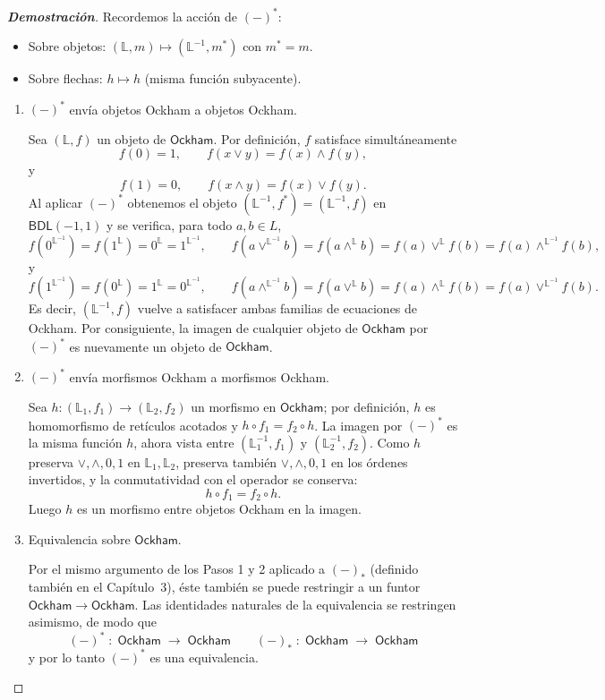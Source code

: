\documentclass[12pt]{book}
\newcommand{\BDL}{\mathsf{BDL}}
\newcommand{\Ock}{\mathsf{Ockham}}
\begin{document}
\begin{proof}[\textbf{Demostración}]
Recordemos la acción de $(-)^*$:
\begin{itemize}
  \item Sobre objetos: $(\mathbb{L},m)\mapsto (\mathbb{L}^{-1},m^*)$ con $m^*=m$.
  \item Sobre flechas: $h\mapsto h$ (misma función subyacente).
\end{itemize}
\begin{enumerate}

\item  $(-)^*$ envía objetos Ockham a objetos Ockham.

Sea $(\mathbb{L},f)$ un objeto de $\Ock$.
Por definición, $f$ satisface simultáneamente
\[
    f(0)=1,\qquad f(x\vee y)=f(x)\wedge f(y),
  \]
  y
  \[
    f(1)=0,\qquad f(x\wedge y)=f(x)\vee f(y).
  \]
Al aplicar $(-)^*$ obtenemos el objeto $(\mathbb{L}^{-1},f^*)=(\mathbb{L}^{-1},f)$ en $\BDL(-1,1)$ y se verifica, para todo $a,b\in L$,
\[
f(0^{\mathbb{L}^{-1}})=f(1^{\mathbb{L}})=0^{\mathbb{L}}=1^{\mathbb{L}^{-1}},
\qquad
f(a\vee^{\mathbb{L}^{-1}} b)=f(a\wedge^{\mathbb{L}} b)
= f(a)\vee^{\mathbb{L}} f(b)=f(a)\wedge^{\mathbb{L}^{-1}} f(b),
\]
y
\[
f(1^{\mathbb{L}^{-1}})=f(0^{\mathbb{L}})=1^{\mathbb{L}}=0^{\mathbb{L}^{-1}},
\qquad
f(a\wedge^{\mathbb{L}^{-1}} b)=f(a\vee^{\mathbb{L}} b)
= f(a)\wedge^{\mathbb{L}} f(b)=f(a)\vee^{\mathbb{L}^{-1}} f(b).
\]
Es decir, $(\mathbb{L}^{-1},f)$ vuelve a satisfacer ambas familias de ecuaciones de Ockham.
Por consiguiente, la imagen de cualquier objeto de $\Ock$ por $(-)^*$ es nuevamente un objeto de $\Ock$.

\smallskip
\item $(-)^*$ envía morfismos Ockham a morfismos Ockham.

Sea $h:(\mathbb{L}_1,f_1)\to(\mathbb{L}_2,f_2)$ un morfismo en $\Ock$; por definición,
$h$ es homomorfismo de retículos acotados y $h\circ f_1=f_2\circ h$.
La imagen por $(-)^*$ es la misma función $h$, ahora vista entre $(\mathbb{L}_1^{-1},f_1)$ y $(\mathbb{L}_2^{-1},f_2)$.
Como $h$ preserva $\vee,\wedge,0,1$ en $\mathbb{L}_1,\mathbb{L}_2$, preserva también $\vee,\wedge,0,1$ en los órdenes invertidos, y la conmutatividad con el operador se conserva:
\[
h\circ f_1=f_2\circ h.
\]
Luego $h$ es un morfismo entre objetos Ockham en la imagen.

\smallskip
\item Equivalencia sobre $\Ock$.

Por el mismo argumento de los Pasos 1 y 2 aplicado a $(-)_*$ (definido también en el Capítulo~3), éste también se puede restringir a un funtor $\Ock\to\Ock$.
Las identidades naturales de la equivalencia se restringen asimismo, de modo que
\[
(-)^* \;:\; \Ock \;\longrightarrow\; \Ock\qquad(-)_* \;:\; \Ock \;\longrightarrow\; \Ock
\]
y por lo tanto $(-)^*$ es una equivalencia.

\end{enumerate}
\end{proof}
\end{document}
